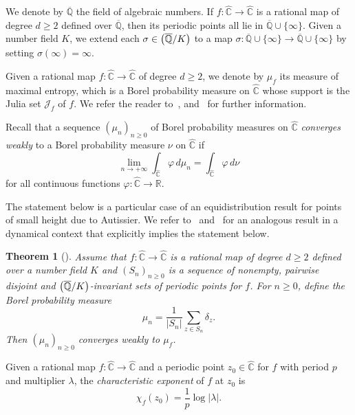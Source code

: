 \documentclass[JEP,XML,SOM,Unicode,published]{cedram}
\newcommand{\NoChangel}[1]{%
\expandafter\let\csname old\string#1\endcsname=#1
\let#1=\relax
\newcommand{#1}{\mathcode`l="716C\csname old\string#1\endcsname\mathcode`l="7160 }%
}
\theoremstyle{plain}
\newtheorem{theorem}{Theorem}
\theoremstyle{definition}
\theoremstyle{remark}
\DeclareMathOperator{\Gal}{Gal}\NoChangel{\Gal}
\begin{document}
We denote by $\overline{\mathbb{Q}}$ the field of algebraic numbers. If $f \colon \widehat{\mathbb{C}} \to \widehat{\mathbb{C}}$ is a rational map of degree $d \geq 2$ defined over $\overline{\mathbb{Q}}$, then its periodic points all lie in $\overline{\mathbb{Q}} \cup \lbrace \infty \rbrace$. Given a number field $K$, we extend each $\sigma \in \Gal\left(\overline{\mathbb{Q}}/K \right)$ to a map $\sigma \colon \overline{\mathbb{Q}} \cup \lbrace \infty \rbrace \to \overline{\mathbb{Q}} \cup \lbrace \infty \rbrace$ by setting $\sigma(\infty) = \infty$.

Given a rational map $f \colon \widehat{\mathbb{C}} \to \widehat{\mathbb{C}}$ of degree $d \geq 2$, we denote by $\mu_{f}$ its measure of maximal entropy, which is a Borel probability measure on $\widehat{\mathbb{C}}$ whose support is the Julia set $\mathcal{J}_{f}$ of $f$. We refer the reader to~\cite{FLM1983}, \cite{L1983} and~\cite{M1983} for further information.

Recall that a sequence $\left(\mu_{n} \right)_{n \geq 0}$ of Borel probability measures on $\widehat{\mathbb{C}}$ \emph{converges weakly} to a Borel probability measure $\nu$ on $\widehat{\mathbb{C}}$ if
\[
\lim_{n \to +\infty} \int_{\widehat{\mathbb{C}}} \varphi \, d\mu_{n} = \int_{\widehat{\mathbb{C}}} \varphi \, d\nu
\]
for all continuous functions $\varphi \colon \widehat{\mathbb{C}} \to \mathbb{R}$.

The statement below is a particular case of an equidistribution result for points of small height due to Autissier. We refer to~\cite[Th.\,10.24]{BR2010} and~\cite[Th.\,2 \& Th.\,4]{FRL2006} for an analogous result in a dynamical context that explicitly implies the statement below.

\begin{theorem}[{\cite[Prop.\,4.1.4]{A2001}}]
\label{theorem:equidistribution}
Assume that $f \colon \widehat{\mathbb{C}} \to \widehat{\mathbb{C}}$ is a rational map of degree $d \geq 2$ defined over a number field $K$ and $\left(S_{n} \right)_{n \geq 0}$ is a sequence of nonempty, pairwise disjoint and $\Gal\left(\overline{\mathbb{Q}}/K \right)$\nobreakdash-invariant sets of periodic points for $f$. For $n \geq 0$, define the Borel probability measure
\[
\mu_{n} = \frac{1}{\left\lvert S_{n} \right\rvert} \sum_{z \in S_{n}} \delta_{z}.
\]
Then $\left(\mu_{n} \right)_{n \geq 0}$ converges weakly to $\mu_{f}$.
\end{theorem}

Given a rational map $f \colon \widehat{\mathbb{C}} \to \widehat{\mathbb{C}}$ and a periodic point $z_{0} \in \widehat{\mathbb{C}}$ for $f$ with period $p$ and multiplier $\lambda$, the \emph{characteristic exponent} of $f$ at $z_{0}$ is
\[
\chi_{f}(z_{0}) = \frac{1}{p} \log\lvert \lambda \rvert.
\]
\end{document}
